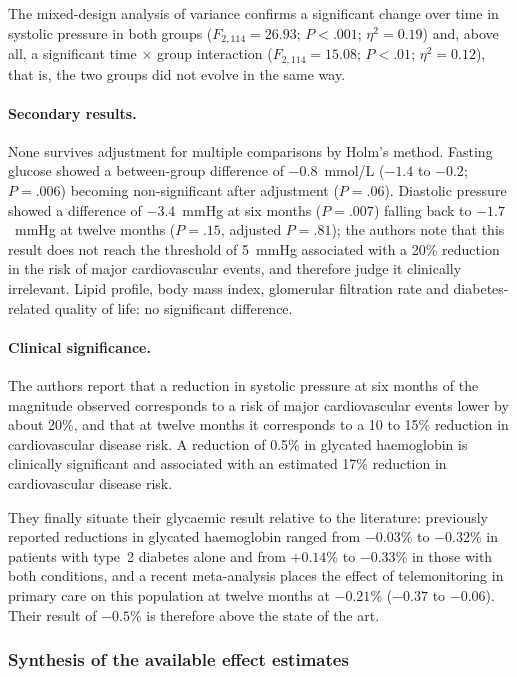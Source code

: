 \documentclass[12pt,a4paper,oneside]{report}
\begin{document}
The mixed-design analysis of variance confirms a significant change over time in systolic pressure in both groups ($F_{2,114} = 26.93$; $P < .001$; $\eta^2 = 0.19$) and, above all, a significant time $\times$ group interaction ($F_{2,114} = 15.08$; $P < .01$; $\eta^2 = 0.12$), that is, the two groups did not evolve in the same way.

\paragraph{Secondary results.} None survives adjustment for multiple comparisons by Holm's method. Fasting glucose showed a between-group difference of $-0.8$~mmol/L ($-1.4$ to $-0.2$; $P = .006$) becoming non-significant after adjustment ($P = .06$). Diastolic pressure showed a difference of $-3.4$~mmHg at six months ($P = .007$) falling back to $-1.7$~mmHg at twelve months ($P = .15$, adjusted $P = .81$); the authors note that this result does not reach the threshold of 5~mmHg associated with a 20\% reduction in the risk of major cardiovascular events, and therefore judge it clinically irrelevant. Lipid profile, body mass index, glomerular filtration rate and diabetes-related quality of life: no significant difference.

\paragraph{Clinical significance.} The authors report that a reduction in systolic pressure at six months of the magnitude observed corresponds to a risk of major cardiovascular events lower by about 20\%, and that at twelve months it corresponds to a 10 to 15\% reduction in cardiovascular disease risk. A reduction of 0.5\% in glycated haemoglobin is clinically significant and associated with an estimated 17\% reduction in cardiovascular disease risk.

They finally situate their glycaemic result relative to the literature: previously reported reductions in glycated haemoglobin ranged from $-0.03\%$ to $-0.32\%$ in patients with type~2 diabetes alone and from $+0.14\%$ to $-0.33\%$ in those with both conditions, and a recent meta-analysis places the effect of telemonitoring in primary care on this population at twelve months at $-0.21\%$ ($-0.37$ to $-0.06$). Their result of $-0.5\%$ is therefore above the state of the art.

\subsubsection{Synthesis of the available effect estimates}
\end{document}
